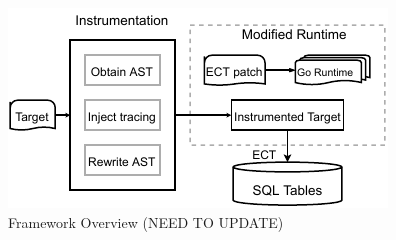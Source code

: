 \begin{figure}
\centering
  \includegraphics[width=.95\linewidth]{figs/overview.pdf}
  \caption{Framework Overview (NEED TO UPDATE)}
  \label{fig:overview}
\end{figure}

